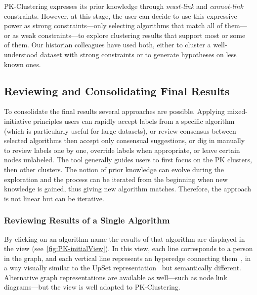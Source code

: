 PK-Clustering expresses its prior knowledge through \emph{must-link} and \emph{cannot-link} constraints. However, at this stage, the user can decide to use this expressive power as strong constraints---only selecting algorithms that match all of them---or as weak constraints---to explore clustering results that support most or some of them. Our historian colleagues have used both, either to cluster a well-understood dataset with strong constraints or to generate hypotheses on less known ones.



\subsection{Reviewing and Consolidating Final Results}
To consolidate the final results several approaches are possible. Applying mixed-initiative principles users can rapidly accept labels from a specific algorithm (which is particularly useful for large datasets), or review consensus between selected algorithms then accept only consensual suggestions, or dig in manually to review labels one by one, override labels when appropriate, or leave certain nodes unlabeled.  The tool generally  guides users to first focus on the PK clusters, then other clusters.
The notion of prior knowledge can evolve during the exploration and the process can be iterated from the beginning when new knowledge is gained, thus giving new algorithm matches. Therefore, the approach is not linear but can be iterative.

\subsubsection{Reviewing Results of a Single Algorithm}
By clicking on an algorithm name the results of that algorithm are displayed in the \paovis view (see~\autoref{fig:PK-initialView}). In this view, each line corresponds to a person in the graph, and each vertical line represents an hyperedge connecting them~\cite{valdiviaAnalyzingDynamicHypergraphs2021}, in a way visually similar to the UpSet representation~\cite{lexUpSetVisualizationIntersecting2014} but semantically different.  Alternative graph representations are available as well---such as node link diagrams---but the \paovis view is well adapted to PK-Clustering.


